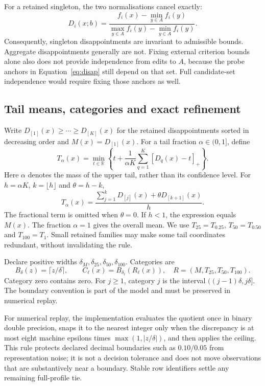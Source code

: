 For a retained singleton, the two normalisations cancel exactly:
\begin{equation}
D_i(x;b)=\frac{f_i(x)-\min_{y\in A}f_i(y)}{\max_{y\in A}f_i(y)-\min_{y\in A}f_i(y)}.
\label{eq:singleton}
\end{equation}
Consequently, singleton disappointments are invariant to admissible bounds. Aggregate disappointments generally are not. Fixing external criterion bounds alone also does not provide independence from edits to $A$, because the probe anchors in Equation~\eqref{eq:disap} still depend on that set. Full candidate-set independence would require fixing those anchors as well.

\subsection{Tail means, categories and exact refinement}
Write $D_{[1]}(x)\ge\cdots\ge D_{[K]}(x)$ for the retained disappointments sorted in decreasing order and $M(x)=D_{[1]}(x)$. For a tail fraction $\alpha\in(0,1]$, define
\begin{equation}
T_\alpha(x)=\min_{t\in\mathbb R}\left\{t+\frac{1}{\alpha K}\sum_{q=1}^K[D_q(x)-t]_+\right\}.
\label{eq:tail}
\end{equation}
Here $\alpha$ denotes the mass of the upper tail, rather than its confidence level. For $h=\alpha K$, $k=\lfloor h\rfloor$ and $\theta=h-k$,
\[
T_\alpha(x)=\frac{\sum_{j=1}^{k}D_{[j]}(x)+\theta D_{[k+1]}(x)}{h}.
\]
The fractional term is omitted when $\theta=0$. If $h<1$, the expression equals $M(x)$. The fraction $\alpha=1$ gives the overall mean. We use $T_{25}=T_{0.25}$, $T_{50}=T_{0.50}$ and $T_{100}=T_1$. Small retained families may make some tail coordinates redundant, without invalidating the rule.

Declare positive widths $\delta_M,\delta_{25},\delta_{50},\delta_{100}$. Categories are
\begin{equation}
B_\delta(z)=\lceil z/\delta\rceil,\qquad C_\ell(x)=B_{\delta_\ell}(R_\ell(x)),\quad R=(M,T_{25},T_{50},T_{100}).
\label{eq:category}
\end{equation}
Category zero contains zero. For $j\ge1$, category $j$ is the interval $((j-1)\delta,j\delta]$. The boundary convention is part of the model and must be preserved in numerical replay.

For numerical replay, the implementation evaluates the quotient once in binary double precision, snaps it to the nearest integer only when the discrepancy is at most eight machine epsilons times $\max(1,|z/\delta|)$, and then applies the ceiling. This rule protects declared decimal boundaries such as $0.10/0.05$ from representation noise; it is not a decision tolerance and does not move observations that are substantively near a boundary. Stable row identifiers settle any remaining full-profile tie.

